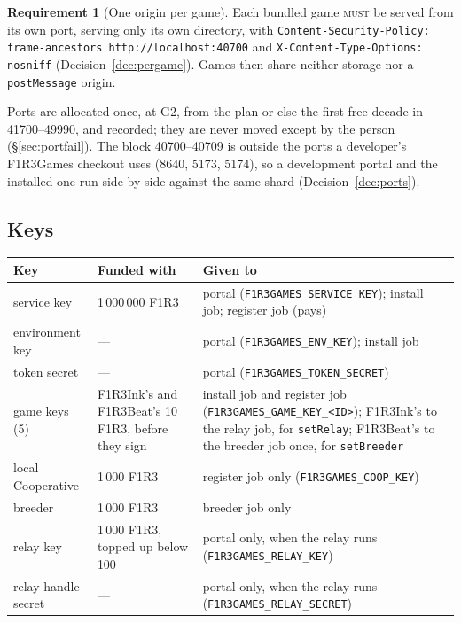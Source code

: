 \documentclass[11pt]{article}
\theoremstyle{definition}
\newtheorem{requirement}{Requirement}
\theoremstyle{remark}
\newcommand{\MUST}{\textsc{must}}
\newcommand{\code}[1]{\texttt{#1}}
\newcommand{\Gm}{F1R3Games}
\begin{document}
\begin{requirement}[One origin per game]
Each bundled game \MUST{} be served from its own port, serving only its own
directory, with \code{Content-Security-Policy: frame-ancestors
http://localhost:40700} and \code{X-Content-Type-Options: nosniff}
(Decision~\ref{dec:pergame}). Games then share neither storage nor a
\code{postMessage} origin.
\end{requirement}

\noindent
Ports are allocated once, at G2, from the plan or else the first free decade in
41700--49990, and recorded; they are never moved except by the person
(\S\ref{sec:portfail}). The block 40700--40709 is outside the ports a developer's
\Gm{} checkout uses (8640, 5173, 5174), so a development portal and the installed one
run side by side against the same shard (Decision~\ref{dec:ports}).

\subsection{Keys}\label{sec:gkeys}

\begin{center}\small
\renewcommand{\arraystretch}{1.15}
\begin{tabularx}{\linewidth}{@{}>{\raggedright\arraybackslash}p{2.6cm}p{2.4cm}>{\raggedright\arraybackslash}X@{}}
\toprule
Key & Funded with & Given to\\
\midrule
service key & 1\,000\,000 F1R3 & portal (\code{F1R3GAMES\_SERVICE\_KEY}); install job; register job (pays)\\
environment key & --- & portal (\code{F1R3GAMES\_ENV\_KEY}); install job\\
token secret & --- & portal (\code{F1R3GAMES\_TOKEN\_SECRET})\\
game keys (5) & F1R3Ink's and F1R3Beat's 10 F1R3, before they sign & install job and register job (\code{F1R3GAMES\_GAME\_KEY\_<ID>}); F1R3Ink's to the relay job, for \code{setRelay}; F1R3Beat's to the breeder job once, for \code{setBreeder}\\
local Cooperative & 1\,000 F1R3 & register job only (\code{F1R3GAMES\_COOP\_KEY})\\
breeder & 1\,000 F1R3 & breeder job only\\
relay key & 1\,000 F1R3, topped up below 100 & portal only, when the relay runs (\code{F1R3GAMES\_RELAY\_KEY})\\
relay handle secret & --- & portal only, when the relay runs (\code{F1R3GAMES\_RELAY\_SECRET})\\
\bottomrule
\end{tabularx}
\end{center}
\end{document}
